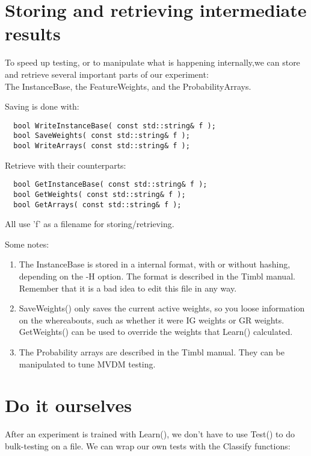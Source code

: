 \section{Storing and retrieving intermediate results}

To speed up testing, or to manipulate what is happening
internally,we can store and retrieve several important parts of our
experiment: \\
The InstanceBase, the FeatureWeights, and the ProbabilityArrays.

Saving is done with:

\begin{verbatim}
  bool WriteInstanceBase( const std::string& f );
  bool SaveWeights( const std::string& f );
  bool WriteArrays( const std::string& f );
\end{verbatim}

Retrieve with their counterparts:

\begin{verbatim}
  bool GetInstanceBase( const std::string& f );
  bool GetWeights( const std::string& f );
  bool GetArrays( const std::string& f );
\end{verbatim}

All use 'f' as a filename for storing/retrieving.

Some notes:\\
\begin{enumerate}
\item The InstanceBase is stored in a internal format, with or without
hashing, depending on the -H option. The format is described in the
Timbl manual. Remember that it is a bad idea to edit this file in any way.
\item  SaveWeights() only saves the current active weights, so you loose
information on the whereabouts, such as whether it were IG weights or
GR weights. GetWeights() can be used to override the weights that
Learn() calculated. 
\item The Probability arrays are described in the Timbl manual. They can be
manipulated to tune MVDM testing.
\end{enumerate}

\section{Do it ourselves}

After an experiment is trained with Learn(), we don't have to use
Test() to do bulk-testing on a file.
We can wrap our own tests with the Classify functions:

